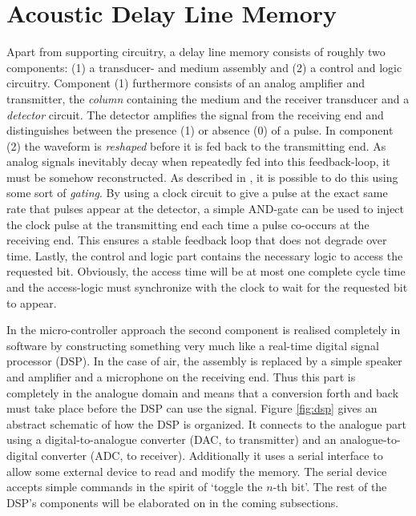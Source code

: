 \documentclass[10pt,a4paper,twocolumn]{article}
\begin{document}
\section{Acoustic Delay Line Memory}
Apart from supporting circuitry, a delay line memory consists of roughly two components: (1) a transducer- and medium assembly and (2) a control and logic circuitry. Component (1) furthermore consists of an analog amplifier and transmitter, the \emph{column} containing the medium and the receiver transducer and a \emph{detector} circuit. The detector amplifies the signal from the receiving end and distinguishes between the presence (1) or absence (0) of a pulse. In component (2) the waveform is \emph{reshaped} before it is fed back to the transmitting end. As analog signals inevitably decay when repeatedly fed into this feedback-loop, it must be somehow reconstructed. As described in \cite{auerbach}, it is possible to do this using some sort of \emph{gating}. By using a clock circuit to give a pulse at the exact same rate that pulses appear at the detector, a simple AND-gate can be used to inject the clock pulse at the transmitting end each time a pulse co-occurs at the receiving end. This ensures a stable feedback loop that does not degrade over time. Lastly, the control and logic part contains the necessary logic to access the requested bit. Obviously, the access time will be at most one complete cycle time and the access-logic must synchronize with the clock to wait for the requested bit to appear.

In the micro-controller approach the second component is realised completely in software by constructing something very much like a real-time digital signal processor (DSP). In the case of air, the assembly is replaced by a simple speaker and amplifier and a microphone on the receiving end. Thus this part is completely in the analogue domain and means that a conversion forth and back must take place before the DSP can use the signal. Figure \ref{fig:dsp} gives an abstract schematic of how the DSP is organized. It connects to the analogue part using a digital-to-analogue converter (DAC, to transmitter) and an analogue-to-digital converter (ADC, to receiver). Additionally it uses a serial interface to allow some external device to read and modify the memory. The serial device accepts simple commands in the spirit of `toggle the $n$-th bit'.  The rest of the DSP's components will be elaborated on in the coming subsections.
\end{document}
